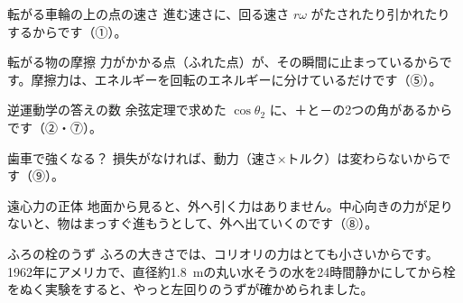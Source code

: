 \begin{tsumazuki}{転がる車輪の上の点の速さ}
進む速さに、回る速さ $r\omega$ がたされたり引かれたりするからです（①）。
\end{tsumazuki}
\begin{tsumazuki}{転がる物の摩擦}
力がかかる点（ふれた点）が、その瞬間に止まっているからです。摩擦力は、エネルギーを回転のエネルギーに分けているだけです（⑤）。
\end{tsumazuki}
\begin{tsumazuki}{逆運動学の答えの数}
余弦定理で求めた $\cos\theta_2$ に、＋と－の2つの角があるからです（②・⑦）。
\end{tsumazuki}
\begin{tsumazuki}{歯車で強くなる？}
損失がなければ、動力（速さ×トルク）は変わらないからです（⑨）。
\end{tsumazuki}
\begin{tsumazuki}{遠心力の正体}
地面から見ると、外へ引く力はありません。中心向きの力が足りないと、物はまっすぐ進もうとして、外へ出ていくのです（⑧）。
\end{tsumazuki}
\begin{tsumazuki}{ふろの栓のうず}
ふろの大きさでは、コリオリの力はとても小さいからです。1962年にアメリカで、直径約\qty{1.8}{m}の丸い水そうの水を24時間静かにしてから栓をぬく実験をすると、やっと左回りのうずが確かめられました。
\end{tsumazuki}


